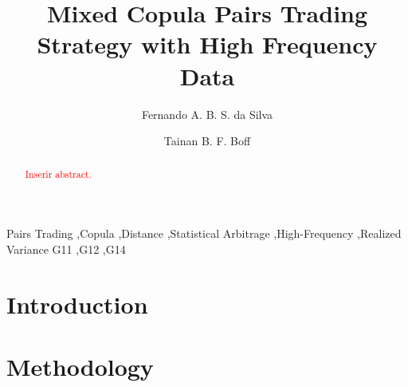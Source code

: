 \documentclass[review]{elsarticle}
\begin{document}
\begin{frontmatter}

\title{Mixed Copula Pairs Trading Strategy with High Frequency Data}



\author[address1]{Fernando A. B. S. da Silva}

\author[address2]{Tainan B. F. Boff}


\address[address1]{Department of Statistics, Institute of Mathematics and Statistics, Federal University of Rio Grande do Sul, 9500 Bento Gonçalves Av., 43-111, Porto Alegre, RS, 91509-900, Brazil}
\address[address2]{Graduate Program in Economics, Federal University of Rio Grande do Sul, Porto Alegre, Brazil}


\begin{abstract}
\textcolor{red}{Inserir abstract.}
\end{abstract}

\begin{keyword}
Pairs Trading \sep Copula \sep Distance \sep Statistical Arbitrage \sep High-Frequency \sep Realized Variance %
\JEL  G11 \sep G12 \sep G14 
\end{keyword}

\end{frontmatter}

\linenumbers

\section{Introduction}

\section{Methodology}
\end{document}
